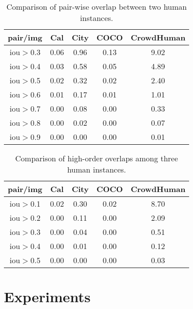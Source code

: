 \documentclass[10pt,twocolumn,letterpaper]{article}
\begin{document}
\begin{table}
\begin{center}
\begin{tabular}{c|cccc}
{pair/img} & {Cal} & {City} & {COCO} & {CrowdHuman} \\
\hline
{iou$>$0.3} & {0.06} & {0.96} & {0.13} & {9.02} \\
{iou$>$0.4} & {0.03} & {0.58} & {0.05} & {4.89} \\
{iou$>$0.5} & {0.02} & {0.32} & {0.02} & {2.40} \\
{iou$>$0.6} & {0.01} & {0.17} & {0.01} & {1.01} \\
{iou$>$0.7} & {0.00} & {0.08} & {0.00} & {0.33} \\
{iou$>$0.8} & {0.00} & {0.02} & {0.00} & {0.07} \\
{iou$>$0.9} & {0.00} & {0.00} & {0.00} & {0.01} \\
\end{tabular}
\caption{Comparison of pair-wise overlap between two human instances.} \label{tab:PairOverlap}
\end{center}

\end{table}


\begin{table}
\begin{center}
\begin{tabular}{c|cccc}
{pair/img} & \multicolumn{1}{c}{Cal} & \multicolumn{1}{c}{City} & \multicolumn{1}{c}{COCO} & \multicolumn{1}{c}{CrowdHuman} \\
\hline
{iou$>$0.1} & {0.02} & {0.30} & {0.02} & {8.70} \\
{iou$>$0.2} & {0.00} & {0.11} & {0.00} & {2.09} \\
{iou$>$0.3} & {0.00} & {0.04} & {0.00} & {0.51} \\
{iou$>$0.4} & {0.00} & {0.01} & {0.00} & {0.12} \\
{iou$>$0.5} & {0.00} & {0.00} & {0.00} & {0.03} \\
\end{tabular}
\end{center}
\caption{Comparison of high-order overlaps among three human instances.} \label{tab:highorderOverlap}
\end{table}

\section{Experiments}
\end{document}
